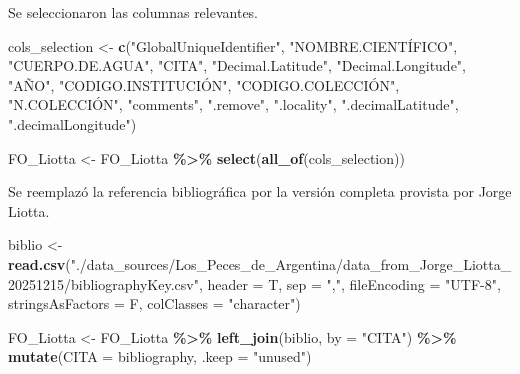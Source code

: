\documentclass[sn-apa,pdflatex]{sn-jnl}
\newenvironment{Shaded}{\begin{snugshade}}{\end{snugshade}}
\newcommand{\AttributeTok}[1]{\textcolor[rgb]{0.13,0.29,0.53}{#1}}
\newcommand{\FunctionTok}[1]{\textcolor[rgb]{0.13,0.29,0.53}{\textbf{#1}}}
\newcommand{\NormalTok}[1]{#1}
\newcommand{\OtherTok}[1]{\textcolor[rgb]{0.56,0.35,0.01}{#1}}
\newcommand{\SpecialCharTok}[1]{\textcolor[rgb]{0.81,0.36,0.00}{\textbf{#1}}}
\newcommand{\StringTok}[1]{\textcolor[rgb]{0.31,0.60,0.02}{#1}}
\begin{document}
Se seleccionaron las columnas relevantes.

\begin{Shaded}
\begin{Highlighting}[]
\NormalTok{cols\_selection }\OtherTok{\textless{}{-}} \FunctionTok{c}\NormalTok{(}\StringTok{"GlobalUniqueIdentifier"}\NormalTok{, }\StringTok{"NOMBRE.CIENTÍFICO"}\NormalTok{,}
    \StringTok{"CUERPO.DE.AGUA"}\NormalTok{, }\StringTok{"CITA"}\NormalTok{, }\StringTok{"Decimal.Latitude"}\NormalTok{, }\StringTok{"Decimal.Longitude"}\NormalTok{,}
    \StringTok{"AÑO"}\NormalTok{, }\StringTok{"CODIGO.INSTITUCIÓN"}\NormalTok{, }\StringTok{"CODIGO.COLECCIÓN"}\NormalTok{, }\StringTok{"N.COLECCIÓN"}\NormalTok{,}
    \StringTok{"comments"}\NormalTok{, }\StringTok{".remove"}\NormalTok{, }\StringTok{".locality"}\NormalTok{, }\StringTok{".decimalLatitude"}\NormalTok{, }\StringTok{".decimalLongitude"}\NormalTok{)}

\NormalTok{FO\_Liotta }\OtherTok{\textless{}{-}}\NormalTok{ FO\_Liotta }\SpecialCharTok{\%\textgreater{}\%}
    \FunctionTok{select}\NormalTok{(}\FunctionTok{all\_of}\NormalTok{(cols\_selection))}
\end{Highlighting}
\end{Shaded}

Se reemplazó la referencia bibliográfica por la versión completa
provista por Jorge Liotta.

\begin{Shaded}
\begin{Highlighting}[]
\NormalTok{biblio }\OtherTok{\textless{}{-}} \FunctionTok{read.csv}\NormalTok{(}\StringTok{"./data\_sources/Los\_Peces\_de\_Argentina/data\_from\_Jorge\_Liotta\_20251215/bibliographyKey.csv"}\NormalTok{,}
    \AttributeTok{header =}\NormalTok{ T, }\AttributeTok{sep =} \StringTok{","}\NormalTok{, }\AttributeTok{fileEncoding =} \StringTok{"UTF{-}8"}\NormalTok{, }\AttributeTok{stringsAsFactors =}\NormalTok{ F,}
    \AttributeTok{colClasses =} \StringTok{"character"}\NormalTok{)}

\NormalTok{FO\_Liotta }\OtherTok{\textless{}{-}}\NormalTok{ FO\_Liotta }\SpecialCharTok{\%\textgreater{}\%}
    \FunctionTok{left\_join}\NormalTok{(biblio, }\AttributeTok{by =} \StringTok{"CITA"}\NormalTok{) }\SpecialCharTok{\%\textgreater{}\%}
    \FunctionTok{mutate}\NormalTok{(}\AttributeTok{CITA =}\NormalTok{ bibliography, }\AttributeTok{.keep =} \StringTok{"unused"}\NormalTok{)}
\end{Highlighting}
\end{Shaded}
\end{document}
